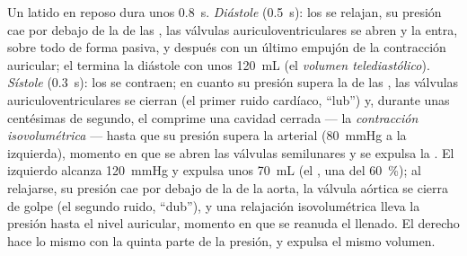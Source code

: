 \begin{proposition}\label{prop:b2:heart:cycle}
Un latido en reposo dura unos \qty{0.8}{s}. \emph{Diástole}
(\qty{0.5}{s}): los  se relajan, su presión cae por debajo de la
de las , las válvulas auriculoventriculares se abren y la 
entra, sobre todo de forma pasiva, y después con un último empujón de la
contracción auricular; el  termina la diástole con unos
\qty{120}{mL} (el \emph{volumen telediastólico}). \emph{Sístole}
(\qty{0.3}{s}): los  se contraen; en cuanto su presión supera la
de las , las válvulas auriculoventriculares se cierran (el primer
ruido cardíaco, ``lub'') y, durante unas centésimas de segundo, el
 comprime una cavidad cerrada --- la \emph{contracción
isovolumétrica} --- hasta que su presión supera la arterial
(\qty{80}{mmHg} a la izquierda), momento en que se abren las válvulas
semilunares y se expulsa la . El  izquierdo alcanza
\qty{120}{mmHg} y expulsa unos
\qty{70}{mL} (el \emph{}, una \emph{} del \qty{60}{\%}); al relajarse, su presión cae por debajo de la
de la aorta, la válvula aórtica se cierra de golpe (el segundo ruido,
``dub''), y una relajación isovolumétrica lleva la presión hasta el nivel
auricular, momento en que se reanuda el llenado. El  derecho hace lo
mismo con la quinta parte de la presión, y expulsa el mismo volumen.
\end{proposition}

